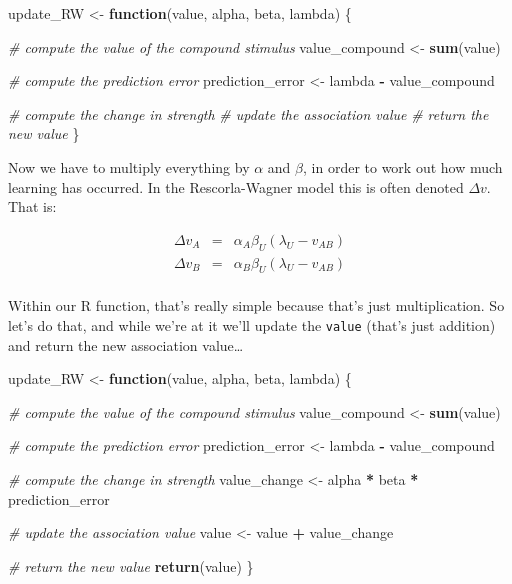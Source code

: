 \documentclass[]{book}
\newenvironment{Shaded}{\begin{snugshade}}{\end{snugshade}}
\newcommand{\CommentTok}[1]{\textcolor[rgb]{0.56,0.35,0.01}{\textit{#1}}}
\newcommand{\ControlFlowTok}[1]{\textcolor[rgb]{0.13,0.29,0.53}{\textbf{#1}}}
\newcommand{\KeywordTok}[1]{\textcolor[rgb]{0.13,0.29,0.53}{\textbf{#1}}}
\newcommand{\NormalTok}[1]{#1}
\newcommand{\OperatorTok}[1]{\textcolor[rgb]{0.81,0.36,0.00}{\textbf{#1}}}
\newcommand{\StringTok}[1]{\textcolor[rgb]{0.31,0.60,0.02}{#1}}
\begin{document}
\begin{Shaded}
\begin{Highlighting}[]
\NormalTok{update_RW <-}\StringTok{ }\ControlFlowTok{function}\NormalTok{(value, alpha, beta, lambda) \{}
  
  \CommentTok{# compute the value of the compound stimulus}
\NormalTok{  value_compound <-}\StringTok{ }\KeywordTok{sum}\NormalTok{(value) }
  
  \CommentTok{# compute the prediction error}
\NormalTok{  prediction_error <-}\StringTok{ }\NormalTok{lambda }\OperatorTok{-}\StringTok{ }\NormalTok{value_compound}
  
  \CommentTok{# compute the change in strength}
  \CommentTok{# update the association value}
  \CommentTok{# return the new value}
\NormalTok{\}}
\end{Highlighting}
\end{Shaded}

Now we have to multiply everything by \(\alpha\) and \(\beta\), in order to work out how much learning has occurred. In the Rescorla-Wagner model this is often denoted \(\Delta v\). That is:

\[
\begin{array}{rcl}
\Delta v_A &=& \alpha_A \beta_U (\lambda_U - v_{AB}) \\
\Delta v_B &=& \alpha_B \beta_U (\lambda_U - v_{AB}) \\
\end{array}
\]

Within our R function, that's really simple because that's just multiplication. So let's do that, and while we're at it we'll update the \texttt{value} (that's just addition) and return the new association value\ldots{}

\begin{Shaded}
\begin{Highlighting}[]
\NormalTok{update_RW <-}\StringTok{ }\ControlFlowTok{function}\NormalTok{(value, alpha, beta, lambda) \{}
  
  \CommentTok{# compute the value of the compound stimulus}
\NormalTok{  value_compound <-}\StringTok{ }\KeywordTok{sum}\NormalTok{(value) }
  
  \CommentTok{# compute the prediction error}
\NormalTok{  prediction_error <-}\StringTok{ }\NormalTok{lambda }\OperatorTok{-}\StringTok{ }\NormalTok{value_compound}
  
  \CommentTok{# compute the change in strength}
\NormalTok{  value_change <-}\StringTok{ }\NormalTok{alpha }\OperatorTok{*}\StringTok{ }\NormalTok{beta }\OperatorTok{*}\StringTok{ }\NormalTok{prediction_error }
  
  \CommentTok{# update the association value}
\NormalTok{  value <-}\StringTok{ }\NormalTok{value }\OperatorTok{+}\StringTok{ }\NormalTok{value_change}
  
  \CommentTok{# return the new value}
  \KeywordTok{return}\NormalTok{(value)}
\NormalTok{\}}
\end{Highlighting}
\end{Shaded}
\end{document}
